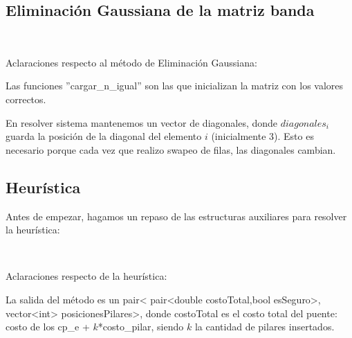\subsection{Eliminación Gaussiana de la matriz banda}

{\tiny



}

~

{\normalsize
Aclaraciones respecto al método de Eliminación Gaussiana:

Las funciones ''cargar\_n\_igual'' son las que inicializan la matriz con los valores correctos.

En resolver sistema mantenemos un vector de diagonales, donde $diagonales_{i}$
guarda la posición de la diagonal del elemento $i$ (inicialmente 3). 
Esto es necesario porque cada vez que realizo swapeo de filas, las diagonales
cambian.
}

\subsection{Heurística}

Antes de empezar, hagamos un repaso de las estructuras auxiliares para resolver la heurística:

{\tiny



}

{\tiny



}

~

Aclaraciones respecto de la heurística:

La salida del método es un pair< pair<double costoTotal,bool esSeguro>, vector<int> posicionesPilares>, donde
costoTotal es el costo total del puente: costo de los cp\_e + $k$*costo\_pilar, siendo $k$ la cantidad de pilares insertados.

